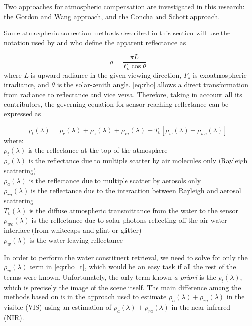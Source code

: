 Two approaches for atmospheric compensation are investigated in this research: the Gordon and Wang approach, and the Concha and Schott approach.

Some atmospheric correction methods described in this section will use the notation used by \cite{Gordon:1994} and \cite{Ruddick:2000bs} who define the apparent reflectance as 

\begin{equation}\label{eq:rho}
  \rho = \frac{\pi L}{F_o \cos{\theta}}
\end{equation}
where $L$ is upward radiance in the given viewing direction, $F_o$ is exoatmospheric irradiance, and $\theta$ is the solar-zenith angle. \autoref{eq:rho} allows a direct transformation from radiance to reflectance and vice versa. Therefore, taking in account all its contributors, the governing equation for sensor-reaching reflectance can be expressed as

\begin{equation}\label{eq:rho_t}
  \rho_t(\lambda) = \rho_r(\lambda) + \rho_a(\lambda) + \rho_{ra}(\lambda) + T_v[\rho_w(\lambda) + \rho_{wc}(\lambda)]
\end{equation}
where:\\
\indent $\rho_t(\lambda)$ is the reflectance at the top of the atmosphere \\
\indent $\rho_r(\lambda)$ is the reflectance due to multiple scatter by air molecules only (Rayleigh scattering)\\
\indent $\rho_a(\lambda)$ is the reflectance due to multiple scatter by aerosols only\\
\indent $\rho_{ra}(\lambda)$ is the reflectance due to the interaction between Rayleigh and aerosol scattering\\
\indent $T_v(\lambda)$ is the diffuse atmospheric transmittance from the water to the sensor\\
\indent $\rho_{wc}(\lambda)$ is the reflectance due to solar photons reflecting off the air-water interface (from whitecaps and glint or glitter)\\
\indent $\rho_w(\lambda)$ is the water-leaving reflectance

In order to perform the water constituent retrieval, we need to solve for only the $\rho_w(\lambda)$ term in \autoref{eq:rho_t}, which would be an easy task if all the rest of the terms were known. Unfortunately, the only term known {\it a priori} is the $\rho_t(\lambda)$, which is precisely the image of the scene itself. The main difference among the methods based on \cite{Gordon:1994} is in the approach used to estimate $\rho_a(\lambda) + \rho_{ra}(\lambda)$ in the visible (VIS) using an estimation of $\rho_a(\lambda) + \rho_{ra}(\lambda)$ in the near infrared (NIR).

